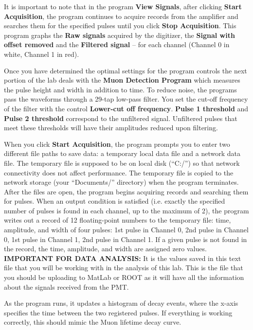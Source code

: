 \documentclass{../lab}
\begin{document}
It is important to note that in the program \textbf{View Signals}, after clicking \textbf{Start Acquisition}, the program continues to acquire records from the amplifier and searches them for the specified pulses until you click \textbf{Stop Acquisition}. This program graphs the \textbf{Raw signals} acquired by the digitizer, the \textbf{Signal with offset removed} and the \textbf{Filtered signal} -- for each channel (Channel 0 in white, Channel 1 in red).

Once you have determined the optimal settings for the program controls the next portion of the lab deals with the\textbf{ Muon Detection Program }which measures the pulse height and width in addition to time. To reduce noise, the programs pass the waveforms through a 29-tap low-pass filter. You set the cut-off frequency of the filter with the control \textbf{Lower-cut off frequency}. \textbf{Pulse 1 threshold} and \textbf{Pulse 2 threshold} correspond to the unfiltered signal. Unfiltered pulses that meet these thresholds will have their amplitudes reduced upon filtering.

\newpage

When you click \textbf{Start Acquisition}, the program prompts you to enter two different file paths to save data: a temporary local data file and a network data file. The temporary file is supposed to be on local disk (``C:/'') so that network connectivity does not affect performance. The temporary file is copied to the network storage (your ``Documents/'' directory) when the program terminates. After the files are open, the program begins acquiring records and searching them for pulses. When an output condition is satisfied (i.e. exactly the specified number of pulses is found in each channel, up to the maximum of 2), the program writes out a record of 12 floating-point numbers to the temporary file: time, amplitude, and width of four pulses: 1st pulse in Channel 0, 2nd pulse in Channel 0, 1st pulse in Channel 1, 2nd pulse in Channel 1. If a given pulse is not found in the record, the time, amplitude, and width are assigned zero values. \textbf{IMPORTANT FOR DATA ANALYSIS:} It is the values saved in this text file that you will be working with in the analysis of this lab. This is the file that you should be uploading to MatLab or ROOT as it will have all the information about the signals received from the PMT.

As the program runs, it updates a histogram of decay events, where the x-axis specifies the time between the two registered pulses. If everything is working correctly, this should mimic the Muon lifetime decay curve.
\end{document}
